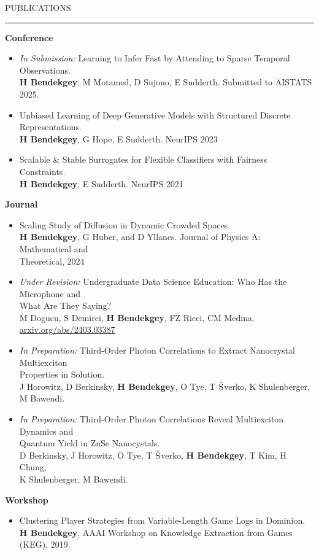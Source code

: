 \documentclass{resume} %
\renewenvironment{rSection}[1]{
\sectionskip
\textcolor{CarnegieMellonRed}{\MakeUppercase{#1}}
\sectionlineskip
\hrule
\begin{list}{}{
\setlength{\leftmargin}{1.5em}
}
\item[]
}{
\end{list}
}
\begin{document}
\newpage
\begin{rSection}{Publications} \itemsep -2pt
{\bf Conference}
\begin{itemize}
	\item \emph{In Submission:} Learning to Infer Fast by Attending to Sparse Temporal Observations.\\
        {\bf H Bendekgey}, M Motamed, D Sujono, E Sudderth. Submitted to AISTATS 2025.

	\item Unbiased Learning of Deep Generative Models with Structured Discrete
Representations.\\
		{\bf H Bendekgey}, G Hope, E Sudderth. NeurIPS 2023
	\item Scalable \& Stable Surrogates for Flexible Classifiers with Fairness Constraints.\\
		{\bf H Bendekgey}, E Sudderth. NeurIPS 2021
\end{itemize}
\vspace{1.0em}
{\bf Journal}
\begin{itemize}
	\item Scaling Study of Diffusion in Dynamic Crowded Spaces.\\
	      {\bf H Bendekgey}, G Huber, and D Yllanes. Journal of Physics A: Mathematical and \\ Theoretical, $2024$
	\item \emph{Under Revision:} Undergraduate Data Science Education: Who Has the Microphone and \\ What Are They Saying?\\
		M Dogucu, S Demirci, {\bf H Bendekgey}, FZ Ricci, CM Medina. \href{https://arxiv.org/abs/2403.03387}{arxiv.org/abs/2403.03387}
	\item \emph{In Preparation:} Third-Order Photon Correlations to Extract Nanocrystal Multiexciton \\Properties in Solution.\\
        J Horowitz, D Berkinsky, {\bf H Bendekgey}, O Tye, T $\check{\textnormal{S}}$verko, K Shulenberger, M Bawendi.	
	\item \emph{In Preparation:} Third-Order Photon Correlations Reveal Multiexciton Dynamics and \\Quantum Yield in ZnSe Nanocystals.\\
        D Berkinsky, J Horowitz, O Tye, T $\check{\textnormal{S}}$verko, {\bf H Bendekgey}, T Kim, H Chung, \\K Shulenberger, M Bawendi.	
\end{itemize}
\vspace{1.0em}
{\bf Workshop}
\begin{itemize}
	\item Clustering Player Strategies from Variable-Length Game Logs in { Dominion}.\\
		{\bf H Bendekgey}, AAAI Workshop on Knowledge Extraction from Games (KEG), 2019.
\end{itemize}
\end{rSection}
\end{document}
